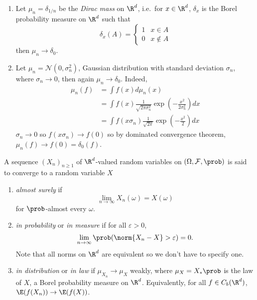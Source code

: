 \documentclass[a4paper]{article}
\renewcommand{\P}{\prob} %
\begin{document}
\begin{eg}\leavevmode
  \begin{enumerate}
  \item Let \(\mu_n = \delta_{1/n}\) be the \emph{Dirac mass} on \(\R^d\), i.e.\ for \(x \in \R^d\), \(\delta_x\) is the Borel probability measure on \(\R^d\) such that
    \[
      \delta_x(A) =
      \begin{cases}
        1 & x \in A \\
        0 & x \notin A
      \end{cases}
    \]
    then \(\mu_n \to \delta_0\).
  \item Let \(\mu_n = \mathcal N(0, \sigma_n^2)\), Gaussian distribution with standard deviation \(\sigma_n\), where \(\sigma_n \to 0\), then again \(\mu_n \to \delta_0\). Indeed,
    \begin{align*}
      \mu_n(f)
      &= \int f(x) d\mu_n(x) \\
      &= \int f(x) \frac{1}{\sqrt{2\pi \sigma_n^2}} \exp (- \frac{x^2}{2\sigma_n^2}) dx \\
      &= \int f(x\sigma_n) \frac{1}{\sqrt{2\pi}} \exp (- \frac{x^2}{2}) dx
    \end{align*}
    \(\sigma_n \to 0\) so \(f(x\sigma_n) \to f(0)\) so by dominated convergence theorem, \(\mu_n(f) \to f(0) = \delta_0(f)\).
  \end{enumerate}
\end{eg}

\begin{definition}
  A sequence \((X_n)_{n \geq 1}\) of \(\R^d\)-valued random variables on \((\Omega, \mathcal F, \P)\) is said to converge to a random variable \(X\)
  \begin{enumerate}
  \item \emph{almost surely} if
    \[
      \lim_{n \to \infty} X_n(\omega) = X(\omega)
    \]
    for \(\P\)-almost every \(\omega\).
  \item \emph{in probability} or \emph{in measure} if for all \(\varepsilon > 0\),
    \[
      \lim_{n \to \infty} \P(\norm{X_n - X} > \varepsilon) = 0.
    \]
    Note that all norms on \(\R^d\) are equivalent so we don't have to specify one.
  \item \emph{in distribution} or \emph{in law} if \(\mu_{X_n} \to \mu_X\) weakly, where \(\mu_X = X_*\P\) is the law of \(X\), a Borel probability measure on \(\R^d\). Equivalently, for all \(f \in C_b(\R^d)\), \(\E(f(X_n)) \to \E(f(X))\).
  \end{enumerate}
\end{definition}
\end{document}
